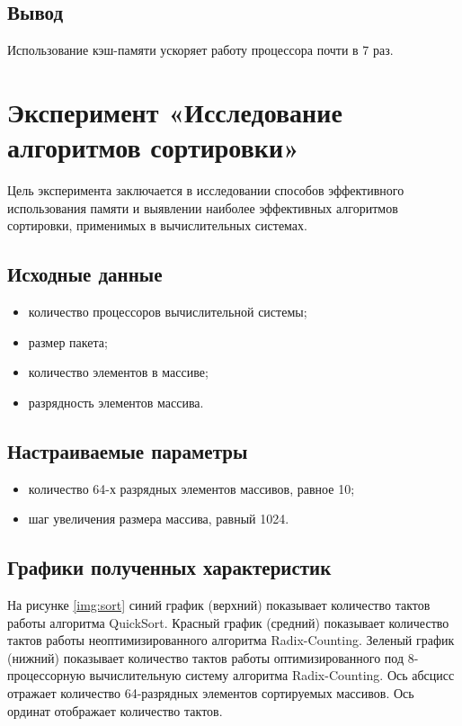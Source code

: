\section{Вывод}

Использование кэш-памяти ускоряет работу процессора почти в 7 раз.

\chapter{Эксперимент «Исследование алгоритмов сортировки»}

Цель эксперимента заключается в исследовании способов эффективного использования памяти и выявлении наиболее эффективных алгоритмов сортировки, применимых в вычислительных
системах.

\section{Исходные данные}

\begin{itemize}
	\item количество процессоров вычислительной системы;
	\item размер пакета;
	\item количество элементов в массиве;
	\item разрядность элементов массива.
\end{itemize}

\section{Настраиваемые параметры}

\begin{itemize}
	\item количество 64-х разрядных элементов массивов, равное 10;
	\item шаг увеличения размера массива, равный 1024.
\end{itemize}

\section{Графики полученных характеристик}

На рисунке \ref{img:sort} синий график (верхний) показывает количество тактов работы алгоритма QuickSort. Красный график (средний) показывает количество тактов работы неоптимизированного алгоритма Radix-Counting. Зеленый график (нижний) показывает количество тактов работы оптимизированного под 8-процессорную вычислительную систему алгоритма Radix-Counting. Ось абсцисс отражает количество 64-разрядных элементов сортируемых массивов. Ось ординат отображает количество тактов.

